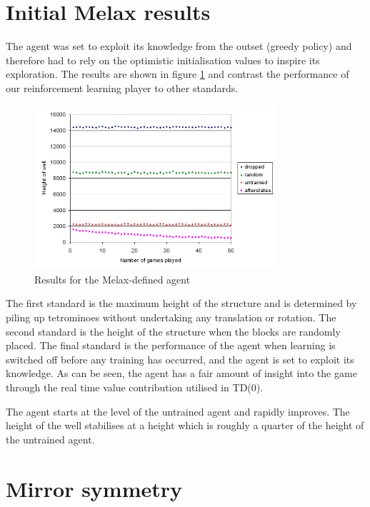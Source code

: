 \documentclass{rucsthesis}
\begin{document}
\section{Initial Melax results}

The agent was set to exploit its knowledge from the outset (greedy policy) and therefore had to rely on the optimistic initialisation values to inspire its exploration. The results are shown in figure \ref{fig:mymelaxresults} and contrast the performance of our reinforcement learning player to other standards. 

\begin{figure}[h]
\centering
\includegraphics[width=3.5in]{mymelaxresults.png}
\caption{Results for the Melax-defined agent}
\label{fig:mymelaxresults}
\end{figure}

The first standard is the maximum height of the structure and is determined by piling up tetrominoes without undertaking any translation or rotation. The second standard is the height of the structure when the blocks are randomly placed. The final standard is the performance of the agent when learning is switched off before any training has occurred, and the agent is set to exploit its knowledge. As can be seen, the agent has a fair amount of insight into the game through the real time value contribution utilised in TD(0).

The agent starts at the level of the untrained agent and rapidly improves. The height of the well stabilises at a height which is roughly a quarter of the height of the untrained agent.

\section{Mirror symmetry}
\end{document}
